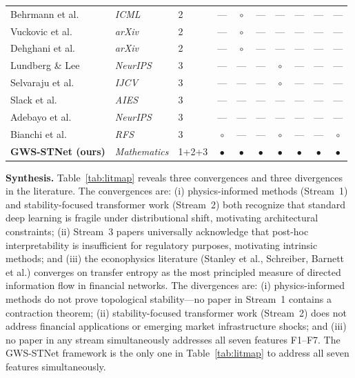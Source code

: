 \documentclass[11pt,a4paper]{article}  %
\theoremstyle{plain}
\theoremstyle{definition}
\theoremstyle{remark}
\begin{document}
\begin{table}[H]
\begin{tabular}{lll ccccccc}
Behrmann et al.~\cite{Behrmann2019}    & \textit{ICML}          & 2 & --- & $\circ$ & --- & --- & --- & --- & --- \\
Vuckovic et al.~\cite{Vuckovic2020}    & \textit{arXiv}         & 2 & --- & $\circ$ & --- & --- & --- & --- & --- \\
Dehghani et al.~\cite{Dehghani2023}    & \textit{arXiv}         & 2 & --- & $\circ$ & --- & --- & --- & --- & --- \\
Lundberg \& Lee~\cite{Lundberg2017}    & \textit{NeurIPS}       & 3 & --- & --- & --- & $\circ$ & --- & --- & --- \\
Selvaraju et al.~\cite{Selvaraju2020}  & \textit{IJCV}          & 3 & --- & --- & --- & $\circ$ & --- & --- & --- \\
Slack et al.~\cite{Slack2020}          & \textit{AIES}          & 3 & --- & --- & --- & --- & --- & --- & --- \\
Adebayo et al.~\cite{Adebayo2018}      & \textit{NeurIPS}       & 3 & --- & --- & --- & --- & --- & --- & --- \\
Bianchi et al.~\cite{Bianchi2021}      & \textit{RFS}           & 3 & $\circ$ & --- & --- & $\circ$ & --- & --- & $\circ$ \\
\midrule
\textbf{GWS-STNet (ours)} & \textit{Mathematics} & 1+2+3
  & $\bullet$ & $\bullet$ & $\bullet$ & $\bullet$ & $\bullet$ & $\bullet$ & $\bullet$ \\
\bottomrule
\end{tabular}
\end{table}

\textbf{Synthesis.} Table~\ref{tab:litmap} reveals three
convergences and three divergences in the literature. The
convergences are: (i) physics-informed methods (Stream~1) and
stability-focused transformer work (Stream~2) both recognize
that standard deep learning is fragile under distributional shift,
motivating architectural constraints; (ii) Stream~3 papers
universally acknowledge that post-hoc interpretability is
insufficient for regulatory purposes, motivating intrinsic methods;
and (iii) the econophysics literature (Stanley et al., Schreiber,
Barnett et al.) converges on transfer entropy as the most
principled measure of directed information flow in financial networks.
The divergences are: (i) physics-informed methods do not prove
topological stability---no paper in Stream~1 contains a
contraction theorem; (ii) stability-focused transformer work
(Stream~2) does not address financial applications or emerging
market infrastructure shocks; and (iii) no paper in any stream
simultaneously addresses all seven features F1--F7.
The GWS-STNet framework is the only one in Table~\ref{tab:litmap} to address all seven features simultaneously.
\end{document}
